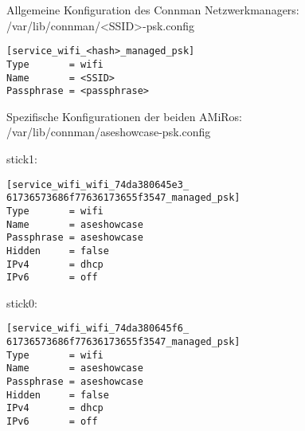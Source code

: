 Allgemeine Konfiguration des Connman Netzwerkmanagers:\\
/var/lib/connman/<SSID>-psk.config
\begin{lstlisting}
[service_wifi_<hash>_managed_psk]
Type       = wifi
Name       = <SSID>
Passphrase = <passphrase>
\end{lstlisting}

Spezifische Konfigurationen der beiden AMiRos:\\
/var/lib/connman/aseshowcase-psk.config

stick1:
\begin{lstlisting}
[service_wifi_wifi_74da380645e3_
61736573686f77636173655f3547_managed_psk]
Type       = wifi
Name       = aseshowcase
Passphrase = aseshowcase
Hidden     = false
IPv4       = dhcp
IPv6       = off
\end{lstlisting}

stick0:
\begin{lstlisting}
[service_wifi_wifi_74da380645f6_
61736573686f77636173655f3547_managed_psk]
Type       = wifi
Name       = aseshowcase
Passphrase = aseshowcase
Hidden     = false
IPv4       = dhcp
IPv6       = off
\end{lstlisting}

